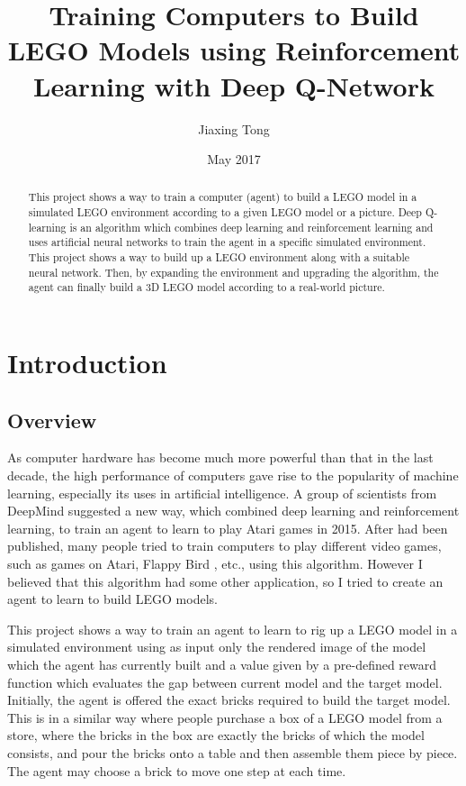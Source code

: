 \documentclass[a4paper]{article}
\title{Training Computers to Build LEGO Models using Reinforcement Learning with Deep Q-Network}
\author{Jiaxing Tong }
\date{May 2017}
\begin{document}
    \maketitle
    
    \begin{abstract}
        This project shows a way to train a computer (agent) to
        build a LEGO model in a simulated LEGO environment 
        according to a given LEGO model or a picture. Deep Q-learning \cite{human-level,DQN}
        is an algorithm which combines deep learning and reinforcement
        learning and uses artificial neural networks to train the
        agent in a specific simulated environment. This project shows
        a way to build up a LEGO environment along with a suitable
        neural network. Then, by expanding the environment and
        upgrading the algorithm, the agent can finally build a 3D
        LEGO model according to a real-world picture. 	
    \end{abstract}
    
    \newpage
    \tableofcontents
    \newpage

    
    \section{Introduction}
        \subsection{Overview}
            As computer hardware has become much more powerful than that
            in the last decade, the high performance of computers gave
            rise to the popularity of machine learning, especially its
            uses in artificial intelligence. A group of scientists from
            DeepMind suggested a new way, which combined deep learning
            and reinforcement learning, to train an agent to learn to
            play Atari games \cite{intro-rl} in 2015. After \cite{intro-rl} had been published,
            many people tried to train computers to play different video
            games, such as games on Atari, Flappy Bird \cite{flappy-bird1,flappy-bird2}, etc., using
            this algorithm. However I believed that this algorithm had
            some other application, so I tried to create an agent to learn
            to build LEGO models. 
            
            This project shows a way to train an agent to learn to rig up a LEGO model in a simulated environment using as input only the rendered image of the model which the agent has currently built and a value given by a pre-defined reward function which evaluates the gap between current model and the target model. Initially, the agent is offered the exact bricks required to build the target model. This is in a similar way where people purchase a box of a LEGO model from a store, where the bricks in the box are exactly the bricks of which the model consists, and pour the bricks onto a table and then assemble them piece by piece. The agent may choose a brick to move one step at each time. 
            
\end{document}
